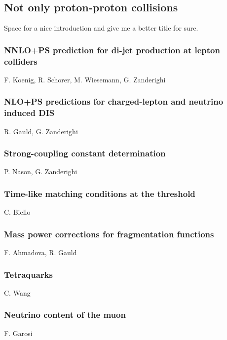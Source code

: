 \documentclass{FBR_Bericht_2025}
\begin{document}
\subsection{Not only proton-proton collisions}
\begin{refsection}
Space for a nice introduction and give me a better title for sure.
%
\subsubsection{NNLO+PS prediction for di-jet production at lepton colliders}
\begin{Namen}
F. Koenig, R. Schorer, M. Wiesemann, G. Zanderighi
\end{Namen}
%
\subsubsection{NLO+PS predictions for charged-lepton and neutrino induced DIS}
\begin{Namen}
R. Gauld, G. Zanderighi
\end{Namen}
%
\subsubsection{Strong-coupling constant determination}
\begin{Namen}
P. Nason, G. Zanderighi
\end{Namen}
%
\subsubsection{Time-like matching conditions at the threshold}
\begin{Namen}
C. Biello
\end{Namen}
%
\subsubsection{Mass power corrections for fragmentation functions}
\begin{Namen}
F. Ahmadova, R. Gauld
\end{Namen}
%
\subsubsection{Tetraquarks}
\begin{Namen}
C. Wang
\end{Namen}
%
\subsubsection{Neutrino content of the muon}
\begin{Namen}
F. Garosi
\end{Namen}
\printbibliography[heading=subbibliography]
\end{refsection}
\end{document}
